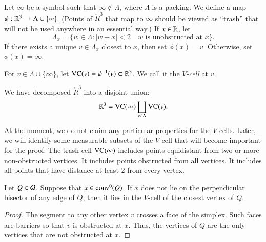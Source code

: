 \begin{definition}[$\phi$]\label{def:trash-phi}
Let $\infty$ be a symbol such that $\infty\not\in\Lambda$,
where $\Lambda$ is a 
packing. We define a map
$\phi:{\mathbb R}^3\to\Lambda\cup\{\infty\}$.   (Points of $\ring{R}^3$ that
map to $\infty$ should be viewed as ``trash'' that will not be
used anywhere in an essential way.)  If $x\in {\mathbb R}$, let
   $$\Lambda_x = 
   \{w\in\Lambda : |w-x|<2 \quad \text{$w$ is unobstructed at $x$}\}.$$
If there exists a unique $v\in\Lambda_x$ closest to $x$, then set
$\phi(x) = v$. Otherwise, set $\phi(x) = \infty$.
\end{definition}

\begin{definition}[$V$-cell,~$VC$]\label{def:vcell}
For $v\in\Lambda\cup\{\infty\}$, 
let ${\operatorname{VC}}(v)=\phi^{-1}(v)\subset\mathbb{R}^3$.
We call it the {\it $V$-cell\/} at
$v$.
%
\end{definition}

We have decomposed $\ring{R}^3$ into a disjoint union:
    $$
    \mathbb{R}^3 = {\operatorname{VC}}(\infty)\coprod_{v\in\Lambda}{\operatorname{VC}}(v).
    $$

\begin{remark}\label{remark:pathology}
At the moment, we do not claim any particular properties for the
$V$-cells.  Later, we will identify some measurable subsets of the
$V$-cell that will become important for the proof.  The trash cell
${\operatorname{VC}}(\infty)$ includes points equidistant from two or more
non-obstructed vertices.  It includes points obstructed from all
vertices.  It includes all points that have distance at least $2$
from every vertex.
\end{remark}

\begin{lemma}\label{lemma:Q-divide}
Let $Q\in{\mathcal Q}$. Suppose that $x\in {\operatorname{conv}}^0(Q)$.
If $x$
does not lie on the perpendicular bisector of any edge of $Q$,
then it lies in the $V$-cell of the closest vertex of $Q$.
\end{lemma}

\begin{proof} The segment to any other vertex $v$ crosses a face of the
simplex. Such faces are barriers so that $v$ is obstructed at $x$.
Thus, the vertices of $Q$ are the only vertices that are not
obstructed at $x$.
\end{proof}


\label{sec:indexing} \label{sec:compact}

